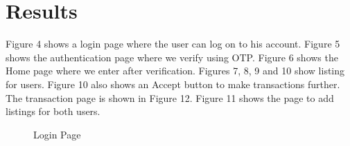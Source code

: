 \documentclass{article}
\begin{document}
\section{Results}
Figure 4 shows a login page where the user can log on to his account. Figure 5 shows the authentication page where we verify using OTP. Figure 6 shows the Home page where we enter after verification. Figures 7, 8, 9 and 10 show listing for users.  Figure 10 also shows an Accept button to make transactions further. The transaction page is shown in Figure 12. Figure 11 shows the page to add listings for both users.\\
\begin{figure}[htbp]
  \centering
  \caption{Login Page}
\end{figure}
\end{document}

